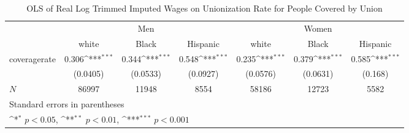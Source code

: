\begin{table}[htbp]\centering
\def\sym#1{\ifmmode^{#1}\else\(^{#1}\)\fi}
\caption{OLS of Real Log Trimmed Imputed Wages on Unionization Rate for People Covered by Union}
\begin{tabular}{l*{6}{c}}
\hline\hline
            &\multicolumn{3}{c}{Men}                                          &\multicolumn{3}{c}{Women}                                        \\\cmidrule(lr){2-4}\cmidrule(lr){5-7}
            &\multicolumn{1}{c}{white}&\multicolumn{1}{c}{Black}&\multicolumn{1}{c}{Hispanic}&\multicolumn{1}{c}{white}&\multicolumn{1}{c}{Black}&\multicolumn{1}{c}{Hispanic}\\
\hline
coveragerate&       0.306\sym{***}&       0.344\sym{***}&       0.548\sym{***}&       0.235\sym{***}&       0.379\sym{***}&       0.585\sym{***}\\
            &    (0.0405)         &    (0.0533)         &    (0.0927)         &    (0.0576)         &    (0.0631)         &     (0.168)         \\
\hline
\(N\)       &       86997         &       11948         &        8554         &       58186         &       12723         &        5582         \\
\hline\hline
\multicolumn{7}{l}{\footnotesize Standard errors in parentheses}\\
\multicolumn{7}{l}{\footnotesize \sym{*} \(p<0.05\), \sym{**} \(p<0.01\), \sym{***} \(p<0.001\)}\\
\end{tabular}
\end{table}
